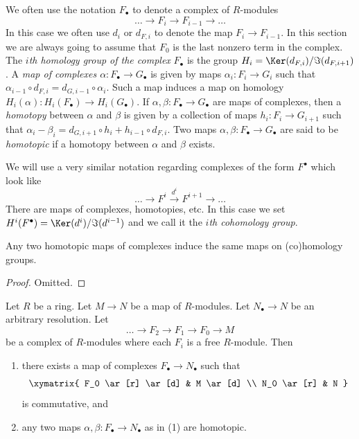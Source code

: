 \noindent
We often use the notation $F_{\bullet}$ to denote a complex
of $R$-modules
$$
\ldots \to F_i \to F_{i-1} \to \ldots
$$
In this case we often use $d_i$ or $d_{F, i}$ to denote the map
$F_i \to F_{i-1}$. In this section we are always going to
assume that $F_0$ is the last nonzero term in the complex.
The {\it $i$th homology group of the complex} $F_{\bullet}$
is the group $H_i = \Ker(d_{F, i})/\Im(d_{F, i + 1})$.
A {\it map of complexes $\alpha : F_{\bullet} \to G_{\bullet}$}
is given by maps $\alpha_i : F_i \to G_i$ such that
$\alpha_{i-1} \circ d_{F, i} = d_{G, i-1} \circ \alpha_i$.
Such a map induces a map on homology $H_i(\alpha) :
H_i(F_{\bullet}) \to H_i(G_{\bullet})$. If $\alpha, \beta
:  F_{\bullet} \to G_{\bullet}$ are maps of complexes, then
a {\it homotopy} between $\alpha$ and $\beta$ is given by
a collection of maps $h_i : F_i \to G_{i + 1}$ such that
$\alpha_i - \beta_i = d_{G, i + 1} \circ h_i +
h_{i-1} \circ d_{F, i}$.
Two maps $\alpha, \beta : F_{\bullet} \to G_{\bullet}$ are
said to be {\it homotopic} if a homotopy between $\alpha$
and $\beta$ exists.

\medskip\noindent
We will use a very similar notation regarding complexes
of the form $F^{\bullet}$ which look like
$$
\ldots \to F^i \xrightarrow{d^i} F^{i + 1} \to \ldots
$$
There are maps of complexes, homotopies, etc.
In this case we set $H^i(F^{\bullet}) =
\Ker(d^i)/\Im(d^{i - 1})$ and we call it
the {\it $i$th cohomology group}.

\begin{lemma}
\label{lemma-homotopic-equal-homology}
Any two homotopic maps of complexes induce the same maps on
(co)homology groups.
\end{lemma}

\begin{proof}
Omitted.
\end{proof}

\begin{lemma}
\label{lemma-compare-resolutions}
Let $R$ be a ring. Let $M \to N$ be a map of $R$-modules.
Let $N_\bullet \to N$ be an arbitrary resolution.
Let
$$
\ldots \to F_2 \to F_1 \to F_0 \to M
$$
be a complex of $R$-modules where each $F_i$ is a free $R$-module. Then
\begin{enumerate}
\item there exists a map of complexes $F_\bullet \to N_\bullet$ such that
$$
\xymatrix{
F_0 \ar[r] \ar[d] & M \ar[d] \\
N_0 \ar[r] & N
}
$$
is commutative, and
\item any two maps $\alpha, \beta : F_\bullet \to N_\bullet$ as in (1)
are homotopic.
\end{enumerate}
\end{lemma}

